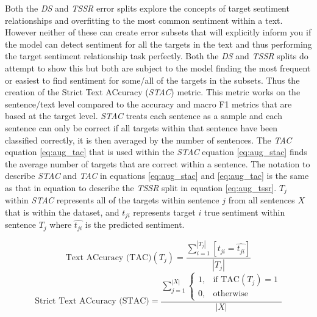 Both the \textit{DS} and \textit{TSSR} error splits explore the concepts of target sentiment relationships and overfitting to the most common sentiment within a text. However neither of these can create error subsets that will explicitly inform you if the model can detect sentiment for all the targets in the text and thus performing the target sentiment relationship task perfectly. Both the \textit{DS} and \textit{TSSR} splits do attempt to show this but both are subject to the model finding the most frequent or easiest to find sentiment for some/all of the targets in the subsets. Thus the creation of the Strict Text ACcuracy (\textit{STAC}) metric. This metric works on the sentence/text level compared to the accuracy and macro F1 metrics that are based at the target level. \textit{STAC} treats each sentence as a sample and each sentence can only be correct if all targets within that sentence have been classified correctly, it is then averaged by the number of sentences. The \textit{TAC} equation \ref{eq:aug_tac} that is used within the \textit{STAC} equation \ref{eq:aug_stac} finds the average number of targets that are correct within a sentence. The notation to describe \textit{STAC} and \textit{TAC} in equations \ref{eq:aug_stac} and \ref{eq:aug_tac} is the same as that in equation to describe the \textit{TSSR} split in equation \ref{eq:aug_tssr}. $T_j$ within \textit{STAC} represents all of the targets within sentence $j$ from all sentences $X$ that is within the dataset, and $t_{ji}$ represents target $i$ true sentiment within sentence $T_j$ where $\hat{t_{ji}}$ is the predicted sentiment.

\begin{equation}
    \text{Text ACcuracy (TAC)}(T_j) = \frac{\sum_{i=1}^{|T_j|} [t_{ji}=\hat{t_{ji}}]}{|T_j|}
    \label{eq:aug_tac}
\end{equation}
\begin{equation}
    \text{Strict Text ACcuracy (STAC)} = \frac{\sum_{j=1}^{|X|} \begin{cases}
    1,& \text{if } \text{TAC}(T_j) = 1\\
    0,              & \text{otherwise}
\end{cases}}{|X|}
\label{eq:aug_stac}
\end{equation}

